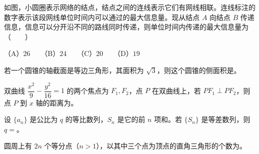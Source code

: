 \begin{question}
如图，小圆圈表示网络的结点，结点之间的连线表示它们有网线相联。连线标注的数字表示该段网线单位时间内可以通过的最大信息量。现从结点 $A$ 向结点 $B$ 传递信息，信息可以分开沿不同的路线同时传递，则单位时间内传递的最大信息量为\mbox{（　　）}
\nopagebreak[4]
\begin{center}\end{center}
\nopagebreak[4]
（A）$26$　　（B）$24$　　（C）$20$　　（D）$19$

\end{question}

\begin{question}
若一个圆锥的轴截面是等边三角形，其面积为 $\sqrt3$，则这个圆锥的侧面积是\gkblank{}。

\end{question}
\begin{question}
双曲线 $\dfrac{x^2}{9}-\dfrac{y^2}{16}=1$ 的两个焦点为 $F_1,F_2$，点 $P$ 在双曲线上，若 $PF_1\perp PF_2$，则点 $P$ 到 $x$ 轴的距离为\gkblank{}。

\end{question}
\begin{question}
设 $\{a_n\}$ 是公比为 $q$ 的等比数列，$S_n$ 是它的前 $n$ 项和。若 $\{S_n\}$ 是等差数列，则 $q=$\gkblank{}。

\end{question}
\begin{question}
圆周上有 $2n$ 个等分点（$n>1$），以其中三个点为顶点的直角三角形的个数为\gkblank{}。

\end{question}

